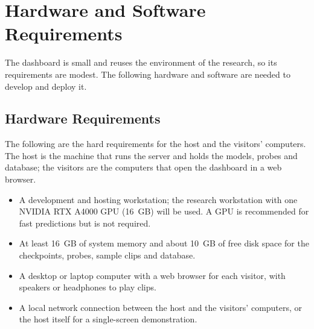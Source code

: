 \documentclass{FastFyp}
\begin{document}
\FloatBarrier
\section{Hardware and Software Requirements}
\label{sec:srs-hwsw}
The dashboard is small and reuses the environment of the research, so its requirements are modest. The following hardware and software are needed to develop and deploy it.

\subsection{Hardware Requirements}
The following are the hard requirements for the host and the visitors' computers. The host is the machine that runs the server and holds the models, probes and database; the visitors are the computers that open the dashboard in a web browser.
\begin{itemize}
  \item A development and hosting workstation; the research workstation with one NVIDIA RTX A4000 GPU (16~GB) will be used. A GPU is recommended for fast predictions but is not required.
  \item At least 16~GB of system memory and about 10~GB of free disk space for the checkpoints, probes, sample clips and database.
  \item A desktop or laptop computer with a web browser for each visitor, with speakers or headphones to play clips.
  \item A local network connection between the host and the visitors' computers, or the host itself for a single-screen demonstration.
\end{itemize}
\end{document}
